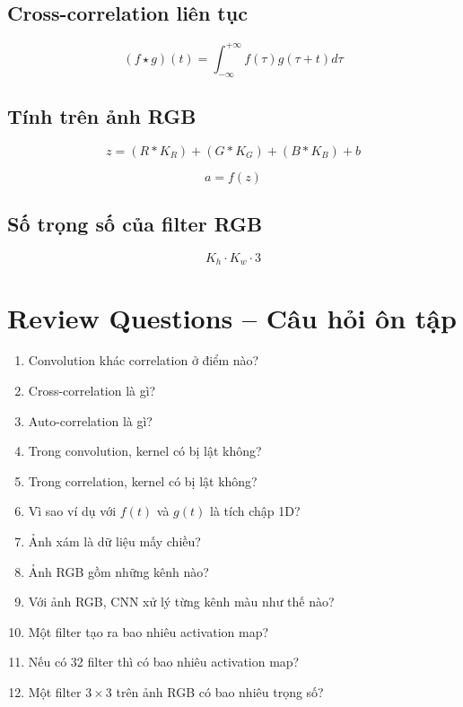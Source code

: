 \subsection*{Cross-correlation liên tục}

\[
    (f \star g)(t)
    =
    \int_{-\infty}^{+\infty}
    f(\tau)g(\tau+t)d\tau
\]

\subsection*{Tính trên ảnh RGB}

\[
    z
    =
    (R*K_R)
    +
    (G*K_G)
    +
    (B*K_B)
    +
    b
\]

\[
    a=f(z)
\]

\subsection*{Số trọng số của filter RGB}

\[
    K_h\cdot K_w\cdot3
\]

\section{Review Questions -- Câu hỏi ôn tập}

\begin{enumerate}
    \item Convolution khác correlation ở điểm nào?
    \item Cross-correlation là gì?
    \item Auto-correlation là gì?
    \item Trong convolution, kernel có bị lật không?
    \item Trong correlation, kernel có bị lật không?
    \item Vì sao ví dụ với $f(t)$ và $g(t)$ là tích chập 1D?
    \item Ảnh xám là dữ liệu mấy chiều?
    \item Ảnh RGB gồm những kênh nào?
    \item Với ảnh RGB, CNN xử lý từng kênh màu như thế nào?
    \item Một filter tạo ra bao nhiêu activation map?
    \item Nếu có 32 filter thì có bao nhiêu activation map?
    \item Một filter $3\times3$ trên ảnh RGB có bao nhiêu trọng số?
\end{enumerate}

